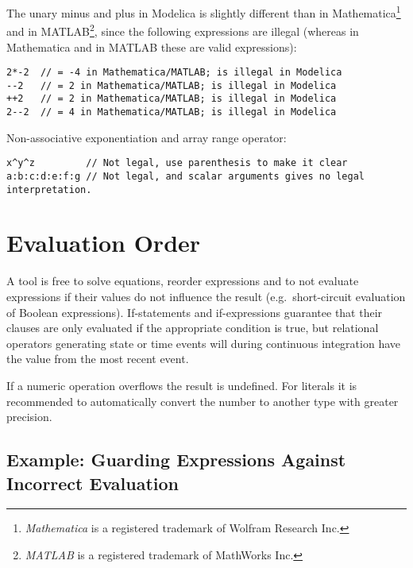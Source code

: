 \begin{nonnormative}
The unary minus and plus in Modelica is slightly different than in Mathematica\footnote{\emph{Mathematica} is a registered trademark of Wolfram Research Inc.} and in MATLAB\footnote{\emph{MATLAB} is
a registered trademark of MathWorks Inc.}, since the following expressions are illegal (whereas in Mathematica and in MATLAB these are valid expressions):
\begin{lstlisting}[language=modelica]
2*-2  // = -4 in Mathematica/MATLAB; is illegal in Modelica
--2   // = 2 in Mathematica/MATLAB; is illegal in Modelica
++2   // = 2 in Mathematica/MATLAB; is illegal in Modelica
2--2  // = 4 in Mathematica/MATLAB; is illegal in Modelica
\end{lstlisting}

Non-associative exponentiation and array range operator:
\begin{lstlisting}[language=modelica]
x^y^z         // Not legal, use parenthesis to make it clear
a:b:c:d:e:f:g // Not legal, and scalar arguments gives no legal interpretation.
\end{lstlisting}
\end{nonnormative}

\section{Evaluation Order}\label{evaluation-order}

A tool is free to solve equations, reorder expressions and to not evaluate expressions if their values do not influence the result (e.g.\ short-circuit
evaluation of Boolean expressions).  If-statements and if-expressions guarantee that their clauses are only evaluated if the appropriate condition is true,
but relational operators generating state or time events will during continuous integration have the value from the most recent event.

If a numeric operation overflows the result is undefined. For literals
it is recommended to automatically convert the number to another type
with greater precision.

\subsection{Example: Guarding Expressions Against Incorrect Evaluation}\label{example-guarding-expressions-against-incorrect-evaluation}

